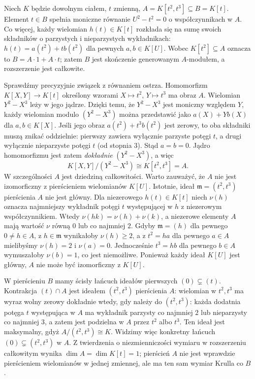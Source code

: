 \begin{przyklad}
\label{aa:prz:integral-cusp-normalization}
Niech $K$ będzie dowolnym ciałem, $t$ zmienną,
$A=K[t^2,t^3]\subseteq B=K[t]$. Element $t\in B$
spełnia moniczne równanie $U^2-t^2=0$ o współczynnikach
w $A$. Co więcej, każdy wielomian $h(t)\in K[t]$
rozkłada się na sumę swoich składników o parzystych
i nieparzystych wykładnikach:
$h(t)=a(t^2)+t b(t^2)$ dla pewnych $a,b\in K[U]$.
Wobec $K[t^2]\subseteq A$ oznacza to
$B=A\cdot1+A\cdot t$; zatem $B$ jest skończenie
generowanym $A$-modułem, a rozszerzenie jest całkowite.

Sprawdźmy precyzyjnie związek z równaniem ostrza.
Homomorfizm $K[X,Y]\to K[t]$ określony wzorami
$X\mapsto t^2$, $Y\mapsto t^3$ ma obraz $A$.
Wielomian $Y^2-X^3$ leży w jego jądrze. Dzięki temu,
że $Y^2-X^3$ jest moniczny względem $Y$, każdy
wielomian modulo $(Y^2-X^3)$ można przedstawić jako
$a(X)+Yb(X)$ dla $a,b\in K[X]$. Jeśli jego obraz
$a(t^2)+t^3b(t^2)$ jest zerowy, to oba składniki
muszą znikać oddzielnie: pierwszy zawiera wyłącznie
parzyste potęgi $t$, a drugi wyłącznie nieparzyste
potęgi $t$ (od stopnia $3$). Stąd $a=b=0$.
Jądro homomorfizmu jest zatem \emph{dokładnie}
$(Y^2-X^3)$, a więc
\[
 K[X,Y]/(Y^2-X^3)\cong K[t^2,t^3]=A.
\]
W szczególności $A$ jest dziedziną całkowitości.
Warto zauważyć, że $A$ nie jest izomorficzny z
pierścieniem wielomianów $K[U]$. Istotnie, ideał
$\mathfrak m=(t^2,t^3)$ pierścienia $A$ nie jest główny.
Dla niezerowego $h(t)\in K[t]$ niech
$\nu(h)$ oznacza najmniejszy wykładnik potęgi $t$
występującej w $h$ z niezerowym współczynnikiem.
Wtedy $\nu(hk)=\nu(h)+\nu(k)$, a niezerowe elementy
$A$ mają wartość $\nu$ równą $0$ lub co najmniej $2$.
Gdyby $\mathfrak m=(h)$ dla pewnego $0\ne h\in A$,
z $h\in\mathfrak m$ wynikałoby $\nu(h)\ge2$,
a z $t^2=ha$ dla pewnego $a\in A$ mielibyśmy
$\nu(h)=2$ i $\nu(a)=0$.
Jednocześnie $t^3=hb$ dla pewnego $b\in A$ wymuszałoby
$\nu(b)=1$, co jest niemożliwe.
Ponieważ każdy ideał $K[U]$ jest główny,
$A$ nie może być izomorficzny z $K[U]$.

W pierścieniu $B$ mamy ścisły łańcuch ideałów pierwszych
$(0)\subsetneq(t)$. Kontrakcja $(t)\cap A$ jest
ideałem $(t^2,t^3)$ pierścienia $A$: wielomian w $t^2,t^3$
ma wyraz wolny zerowy dokładnie wtedy, gdy należy do
$(t^2,t^3)$: każda dodatnia potęga $t$ występująca w $A$
ma wykładnik parzysty co najmniej $2$ lub nieparzysty
co najmniej $3$, a zatem jest podzielna w $A$ przez
$t^2$ albo $t^3$. Ten ideał jest maksymalny, gdyż
$A/(t^2,t^3)\cong K$. Widzimy więc konkretny łańcuch
$(0)\subsetneq(t^2,t^3)$ w $A$. Z twierdzenia o
niezmienniczości wymiaru w rozszerzeniu całkowitym wynika
$\dim A=\dim K[t]=1$; pierścień $A$ nie jest wprawdzie
pierścieniem wielomianów w jednej zmiennej, ale ma ten sam
wymiar Krulla co $B$.
\end{przyklad}
